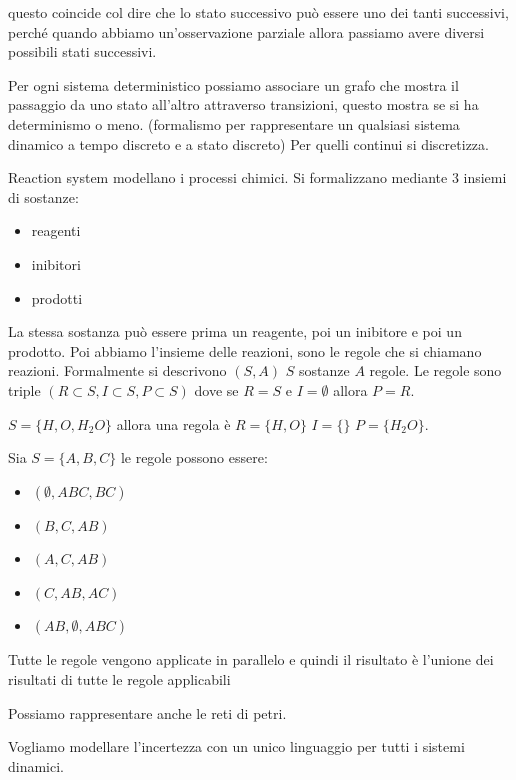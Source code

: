questo coincide col dire che lo stato successivo può essere uno dei tanti successivi,
perché quando abbiamo un'osservazione parziale allora passiamo avere diversi possibili 
stati successivi.

Per ogni sistema deterministico possiamo associare un grafo che mostra il passaggio 
da uno stato all'altro attraverso transizioni, questo mostra se si ha determinismo 
o meno. (formalismo per rappresentare un qualsiasi sistema dinamico a tempo discreto 
e a stato discreto) Per quelli continui si discretizza.


Reaction system modellano i processi chimici. Si formalizzano mediante $3$ insiemi di sostanze:
\begin{itemize}
    \item reagenti
    \item inibitori
    \item prodotti
\end{itemize}
La stessa sostanza può essere prima un reagente, poi un inibitore e poi un prodotto.
Poi abbiamo l'insieme delle reazioni, sono le regole che si chiamano reazioni.
Formalmente si descrivono $(S,A)$ $S$ sostanze $A$ regole. Le regole sono triple 
$(R\subset S, I\subset S, P\subset S)$ dove se $R=S$ e $I=\emptyset$ allora $P=R$.

\begin{esempio}
    $S=\{H,O,H_2O\}$ allora una regola è $R=\{H,O\}$ $I = \{\}$ $P=\{H_2O\}$.
\end{esempio}

\begin{esempio}
    Sia $S=\{A,B,C\}$ le regole possono essere:
    \begin{itemize}
        \item $(\emptyset, ABC,BC)$
        \item $(B, C,AB)$
        \item $(A, C,AB)$
        \item $(C, AB,AC)$
        \item $(AB, \emptyset,ABC)$
    \end{itemize}
    Tutte le regole vengono applicate in parallelo e quindi il risultato è l'unione 
    dei risultati di tutte le regole applicabili
\end{esempio}

Possiamo rappresentare anche le reti di petri.

Vogliamo modellare l'incertezza con un unico linguaggio per tutti i sistemi dinamici.

